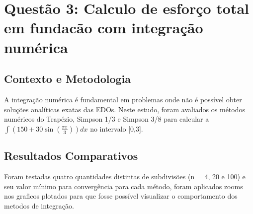 \documentclass{article}
\begin{document}
\section*{Questão 3:  Calculo de esforço total em fundacão com integração numérica}
\justifying
\subsection*{Contexto e Metodologia}

A integração numérica é fundamental em problemas onde não é possível obter soluções analíticas exatas das EDOs. Neste estudo, foram avaliados os métodos numéricos do Trapézio, Simpson 1/3 e Simpson 3/8 para calcular a $\int \left(150 + 30\sin\left(\frac{{\pi x}}{{3}}\right)\right) dx$ no intervalo [0,3].

\subsection*{Resultados Comparativos}
Foram testadas quatro quantidades distintas de subdivisões (n = 4, 20 e 100) e seu valor mínimo para convergência para cada método, foram aplicados zooms nos graficos plotados para que fosse possível visualizar o comportamento dos metodos de integração.
\end{document}
